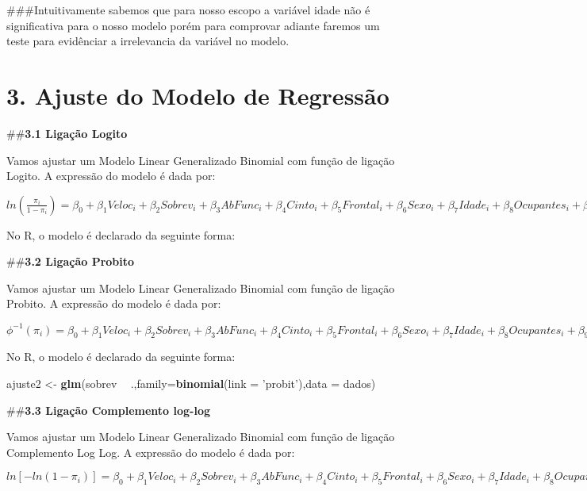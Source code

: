 \documentclass[
]{article}
\newenvironment{Shaded}{\begin{snugshade}}{\end{snugshade}}
\newcommand{\DataTypeTok}[1]{\textcolor[rgb]{0.13,0.29,0.53}{#1}}
\newcommand{\KeywordTok}[1]{\textcolor[rgb]{0.13,0.29,0.53}{\textbf{#1}}}
\newcommand{\NormalTok}[1]{#1}
\newcommand{\OperatorTok}[1]{\textcolor[rgb]{0.81,0.36,0.00}{\textbf{#1}}}
\newcommand{\StringTok}[1]{\textcolor[rgb]{0.31,0.60,0.02}{#1}}
\begin{document}
\#\#\#Intuitivamente sabemos que para nosso escopo a variável idade não
é significativa para o nosso modelo porém para comprovar adiante faremos
um teste para evidênciar a irrelevancia da variável no modelo.

\hypertarget{ajuste-do-modelo-de-regressuxe3o}{%
\section{3. Ajuste do Modelo de
Regressão}\label{ajuste-do-modelo-de-regressuxe3o}}

\#\#\textbf{3.1 Ligação Logito}

Vamos ajustar um Modelo Linear Generalizado Binomial com função de
ligação Logito. A expressão do modelo é dada por:

\(ln (\frac{\pi_i}{1-\pi_i}) = \beta_0 + \beta_1 Veloc_i + \beta_2 Sobrev_i + \beta_3 AbFunc_i + \beta_4 Cinto_i + \beta_5 Frontal_i + \beta_6 Sexo_i + \beta_7 Idade_i + \beta_8 Ocupantes_i + \beta_9 Grav_i\)

No R, o modelo é declarado da seguinte forma:

\#\#\textbf{3.2 Ligação Probito}

Vamos ajustar um Modelo Linear Generalizado Binomial com função de
ligação Probito. A expressão do modelo é dada por:

\(\phi^{-1} (\pi_i) = \beta_0 + \beta_1 Veloc_i + \beta_2 Sobrev_i + \beta_3 AbFunc_i + \beta_4 Cinto_i + \beta_5 Frontal_i + \beta_6 Sexo_i + \beta_7 Idade_i + \beta_8 Ocupantes_i + \beta_9 Grav_i\)

No R, o modelo é declarado da seguinte forma:

\begin{Shaded}
\begin{Highlighting}[]
\NormalTok{ajuste2 <-}\StringTok{ }\KeywordTok{glm}\NormalTok{(sobrev }\OperatorTok{~}\StringTok{ }\NormalTok{.,}\DataTypeTok{family=}\KeywordTok{binomial}\NormalTok{(}\DataTypeTok{link =} \StringTok{'probit'}\NormalTok{),}\DataTypeTok{data =}\NormalTok{ dados)}
\end{Highlighting}
\end{Shaded}

\#\#\textbf{3.3 Ligação Complemento log-log}

Vamos ajustar um Modelo Linear Generalizado Binomial com função de
ligação Complemento Log Log. A expressão do modelo é dada por:

\(ln[-ln(1-\pi_i)] = \beta_0 + \beta_1 Veloc_i + \beta_2 Sobrev_i + \beta_3 AbFunc_i + \beta_4 Cinto_i + \beta_5 Frontal_i + \beta_6 Sexo_i + \beta_7 Idade_i + \beta_8 Ocupantes_i + \beta_9 Grav_i\)
\end{document}
